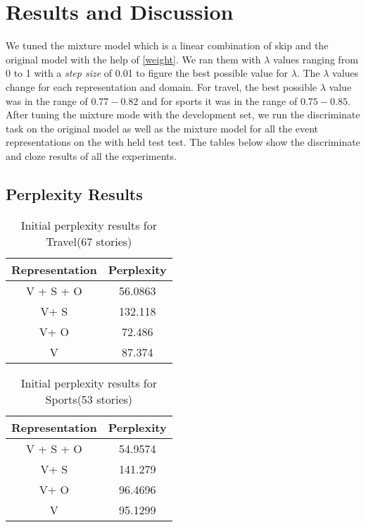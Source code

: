 \documentclass[12pt]{article}
\begin{document}
\section{Results and Discussion}
We tuned the mixture model which is a linear combination of skip and the original model with the help of \ref{weight}. We ran them with $\lambda$ values ranging from 0 to 1 with a \textit{step size} of 0.01 to figure the best possible value for $\lambda$. The $\lambda$ values change for each representation and domain. For travel, the best possible $\lambda$ value was in the range of $0.77 - 0.82$ and for sports it was in the range of $0.75-0.85$. After tuning the mixture mode with the development set, we run the discriminate task on the original model as well as the mixture model for all the event representations on the with held test test. The tables below show the discriminate and cloze results of all the experiments. \\
\subsection{Perplexity Results}
\begin{table}[H]
	\centering
	\begin{tabular}{|c|c|}
		\hline Representation  & Perplexity  \\ 
		\hline V + S + O & 56.0863  \\ 
		\hline  V+ S & 132.118 \\ 
		\hline  V+ O & 72.486 \\ 
		\hline  V & 87.374 \\ 
		\hline 
		\end{tabular} 
		\caption{Initial perplexity results for Travel(67 stories)}
		\end{table}
		\begin{table}[H]
			\centering
			\begin{tabular}{|c|c|}
				\hline Representation  & Perplexity  \\ 
				\hline V + S + O & 54.9574  \\ 
				\hline  V+ S & 141.279 \\ 
				\hline  V+ O & 96.4696 \\ 
				\hline  V & 95.1299 \\ 
				\hline 
				\end{tabular} 
				\caption{Initial perplexity results for Sports(53 stories)}
				\end{table}
\end{document}
